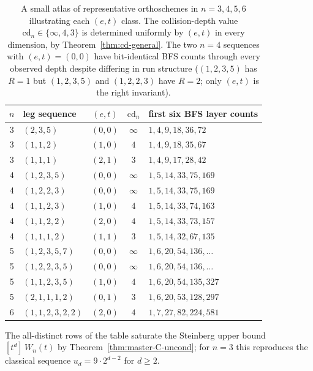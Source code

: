 \documentclass[11pt,a4paper]{article}
\theoremstyle{remark}
\theoremstyle{plain}
\begin{document}
\begin{table}[ht!]
\centering
\small
\renewcommand{\arraystretch}{1.2}
\begin{tabular}{c l c c l}
\toprule
$n$ & leg sequence & $(e, t)$ & $\mathrm{cd}_n$ & first six BFS layer counts \\
\midrule
3 & $(2, 3, 5)$       & $(0, 0)$ & $\infty$ & $1, 4, 9, 18, 36, 72$ \\
3 & $(1, 1, 2)$       & $(1, 0)$ & $4$      & $1, 4, 9, 18, 35, 67$ \\
3 & $(1, 1, 1)$       & $(2, 1)$ & $3$      & $1, 4, 9, 17, 28, 42$ \\
\midrule
4 & $(1, 2, 3, 5)$    & $(0, 0)$ & $\infty$ & $1, 5, 14, 33, 75, 169$ \\
4 & $(1, 2, 2, 3)$    & $(0, 0)$ & $\infty$ & $1, 5, 14, 33, 75, 169$ \\
4 & $(1, 1, 2, 3)$    & $(1, 0)$ & $4$      & $1, 5, 14, 33, 74, 163$ \\
4 & $(1, 1, 2, 2)$    & $(2, 0)$ & $4$      & $1, 5, 14, 33, 73, 157$ \\
4 & $(1, 1, 1, 2)$    & $(1, 1)$ & $3$      & $1, 5, 14, 32, 67, 135$ \\
\midrule
5 & $(1, 2, 3, 5, 7)$    & $(0, 0)$ & $\infty$ & $1, 6, 20, 54, 136, \ldots$ \\
5 & $(1, 2, 2, 3, 5)$    & $(0, 0)$ & $\infty$ & $1, 6, 20, 54, 136, \ldots$ \\
5 & $(1, 1, 2, 3, 5)$    & $(1, 0)$ & $4$      & $1, 6, 20, 54, 135, 327$ \\
5 & $(2, 1, 1, 1, 2)$    & $(0, 1)$ & $3$      & $1, 6, 20, 53, 128, 297$ \\
\midrule
6 & $(1, 1, 2, 3, 2, 2)$ & $(2, 0)$ & $4$      & $1, 7, 27, 82, 224, 581$ \\
\bottomrule
\end{tabular}
\caption{A small atlas of representative orthoschemes in $n = 3, 4, 5, 6$
illustrating each $(e, t)$ class.  The collision-depth value
$\mathrm{cd}_n \in \{\infty, 4, 3\}$ is determined uniformly by
$(e, t)$ in every dimension, by Theorem~\ref{thm:cd-general}.  The
two $n = 4$ sequences with $(e, t) = (0, 0)$ have bit-identical
BFS counts through every observed depth despite differing in run
structure ($(1, 2, 3, 5)$ has $R = 1$ but $(1, 2, 3, 5)$ and $(1, 2, 2, 3)$ have $R = 2$; only $(e, t)$ is the right invariant).}
\label{tab:atlas}
\end{table}

The all-distinct rows of the table saturate the Steinberg upper
bound $[t^d]\, W_n(t)$ by Theorem~\ref{thm:master-C-uncond}; for
$n = 3$ this reproduces the classical sequence
$u_d = 9 \cdot 2^{d-2}$ for $d \ge 2$.
\end{document}
